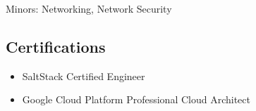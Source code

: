 
Minors: Networking, Network Security

\vspace{6pt}

\subsection{Certifications}
\begin{itemize}
    \item SaltStack Certified Engineer
    \item Google Cloud Platform Professional Cloud Architect
\end{itemize}

\vspace{6pt}